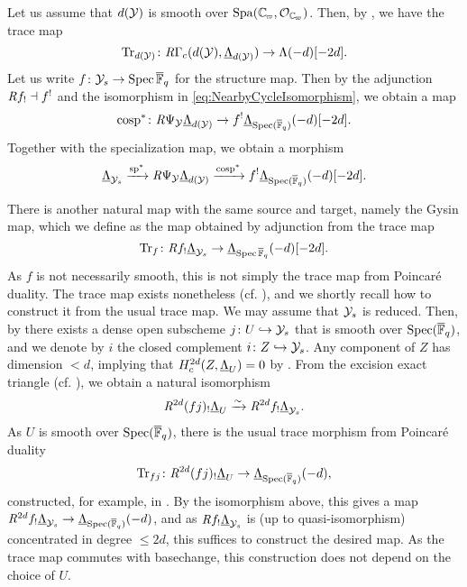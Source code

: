 \documentclass[../main.tex]{subfiles}
\begin{document}
Let us assume that $d(\mathcal{Y})$ is smooth over $\Spa(\Cp, \cO_\Cp)$. Then, by
\cite[Theorem 7.3.4]{huber2013etale}, we have the trace map
\begin{equation*}
  \operatorname{Tr}_{d(\mathcal{Y})} \colon \mathit R  \Gamma_c( d(\mathcal{Y}), \underline \Lambda_{d(\mathcal{Y})} ) \to 
  \Lambda (-d)[-2d].
\end{equation*}
Let us write $f \colon \mathcal{Y}_s \to \operatorname{Spec}{\overline {\mathbb{F}}_q}$ for the structure map. Then by the 
adjunction $\mathit R f_! \dashv f^!$ and the isomorphism in \eqref{eq:NearbyCycleIsomorphism},
we obtain a map
\begin{equation*}
  \mathrm{cosp}^* \colon \mathit R\Psi_{\mathcal{Y}} \underline\Lambda_{d(\mathcal{Y})} \to f^!
  \underline\Lambda_{\operatorname{Spec}({\overline {\mathbb{F}}_q})}(-d)[-2d].
\end{equation*}
Together with the specialization map, we obtain a morphism
\begin{equation*}
  \underline \Lambda_{\mathcal{Y}_s} \xrightarrow{\mathrm{sp}^*} \mathit R\Psi_{\mathcal{Y}} \underline\Lambda_{d(\mathcal{Y})} 
  \xrightarrow{\mathrm{cosp}^*} f^! \underline\Lambda_{\operatorname{Spec}({\overline {\mathbb{F}}_q})}(-d)[-2d].
\end{equation*}

There is another natural map with the same source and target, namely the 
Gysin map, which we define as the map obtained by adjunction from the trace map
\begin{equation*}
  \operatorname{Tr}_f\colon \mathit R f_! \underline \Lambda_{\mathcal{Y}_s} \to \underline \Lambda_{\operatorname{Spec} {\overline {\mathbb{F}}_q}}(-d)[-2d].
\end{equation*}
As $f$ is not necessarily smooth, this is not
simply the trace map from Poincar\'e duality. The trace map exists
nonetheless (cf. \cite[XVIII, Théorème 2.9]{SGA4}), and we shortly 
recall how to construct it from the usual trace map. We may assume that $\mathcal{Y}_s$
is reduced. Then, by \cite[\href{https://stacks.math.columbia.edu/tag/056V}{Tag
056V}]{stacks-project} 
there exists a dense open subscheme $j \colon U \hookrightarrow \mathcal{Y}_s$ that is smooth over 
$\operatorname{Spec}({\overline {\mathbb{F}}_q})$, and we denote by $i$ the closed complement 
$i \colon Z \hookrightarrow \mathcal{Y}_s$. Any component of $Z$ has dimension $< d$, implying that
$H^{2d}_c(Z, \underline \Lambda_U) = 0$ by \cite[Theorem 7.4.5]{LeiFuEtale}.
From the excision exact triangle (cf. \cite[Theorem 7.4.4 (iii)]{LeiFuEtale}),
we obtain a natural isomorphism
\begin{equation*}
  \mathit R^{2d} (fj)_! \underline \Lambda_U \xrightarrow{\sim} \mathit R^{2d} f_! \underline
  \Lambda_{\mathcal{Y}_s}.
\end{equation*}
As $U$ is smooth over $\operatorname{Spec}({\overline {\mathbb{F}}_q})$, there is the usual trace morphism from
Poincar\'e duality
\begin{equation*}
  \operatorname{Tr}_{fj}\colon \mathit R^{2d}(fj)_! \underline \Lambda_U \to \underline
  \Lambda_{\operatorname{Spec}({\overline {\mathbb{F}}_q})}(-d),
\end{equation*}
constructed, for example, in \cite[Section 8.2]{LeiFuEtale}. By the isomorphism
above, this gives a map $\mathit R^{2d} f_! \underline \Lambda_{\mathcal{Y}_s} \to \underline
\Lambda_{\operatorname{Spec}({\overline {\mathbb{F}}_q})}(-d)$, and as $\mathit R f_! \underline \Lambda_{\mathcal{Y}_s}$ is
(up to quasi-isomorphism) concentrated in degree $\leq 2d$, this suffices to
construct the desired map. As the trace map commutes with basechange, this construction
does not depend on the choice of $U$.
\end{document}
